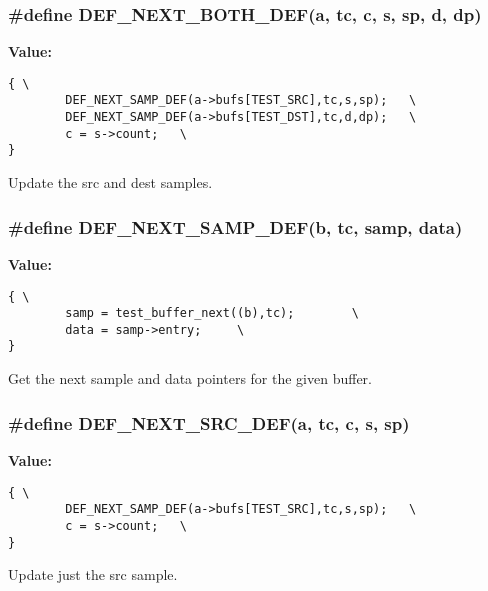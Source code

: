 \subsubsection{\setlength{\rightskip}{0pt plus 5cm}\#define DEF\_\-NEXT\_\-BOTH\_\-DEF(a, tc, c, s, sp, d, dp)}\label{def__test__def_8h_a1}


{\bf Value:}

\footnotesize\begin{verbatim}{ \
        DEF_NEXT_SAMP_DEF(a->bufs[TEST_SRC],tc,s,sp);   \
        DEF_NEXT_SAMP_DEF(a->bufs[TEST_DST],tc,d,dp);   \
        c = s->count;   \
}\end{verbatim}\normalsize 
Update the src and dest samples.

\subsubsection{\setlength{\rightskip}{0pt plus 5cm}\#define DEF\_\-NEXT\_\-SAMP\_\-DEF(b, tc, samp, data)}\label{def__test__def_8h_a0}


{\bf Value:}

\footnotesize\begin{verbatim}{ \
        samp = test_buffer_next((b),tc);        \
        data = samp->entry;     \
}\end{verbatim}\normalsize 
Get the next sample and data pointers for the given buffer.

\subsubsection{\setlength{\rightskip}{0pt plus 5cm}\#define DEF\_\-NEXT\_\-SRC\_\-DEF(a, tc, c, s, sp)}\label{def__test__def_8h_a2}


{\bf Value:}

\footnotesize\begin{verbatim}{ \
        DEF_NEXT_SAMP_DEF(a->bufs[TEST_SRC],tc,s,sp);   \
        c = s->count;   \
}\end{verbatim}\normalsize 
Update just the src sample.

